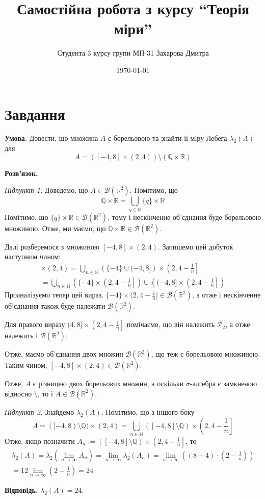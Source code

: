 \documentclass[14pt]{extarticle}
\title{Самостійна робота з курсу ``Теорія міри''}
\author{Студента 3 курсу групи МП-31 Захарова Дмитра}
\date{\today}
\begin{document}
\maketitle

\section*{Завдання}
\textbf{Умова.} Довести, що множина $A$ є борельовою та знайти її мiру Лебега $\lambda_2(A)$ для
\[
A = ([-4,8] \times (2,4)) \setminus (\mathbb{Q} \times \mathbb{R})
\]

\textbf{Розв'язок.} 

\textit{Підпункт 1.} Доведемо, що $A \in \mathcal{B}(\mathbb{R}^2)$. Помітимо, що
\[
\mathbb{Q} \times \mathbb{R} = \bigcup_{q \in \mathbb{Q}} \{q\} \times \mathbb{R}
\]
Помітимо, що $\{q\} \times \mathbb{R} \in \mathcal{B}(\mathbb{R}^2)$, тому і нескінченне об'єднання буде борельовою множиною. Отже, ми маємо, що $\mathbb{Q} \times \mathbb{R} \in \mathcal{B}(\mathbb{R}^2)$.

Далі розберемося з множиною $[-4,8] \times (2,4)$. Запишемо цей добуток наступним чином:
\begin{gather*}
[-4,8] \times (2,4) = \bigcup_{n \in \mathbb{N}} \left(\{-4\} \cup (-4,8]\right) \times \left( 2, 4 - \frac{1}{n} \right] \\
= \bigcup_{n \in \mathbb{N}} \left( \{-4\} \times \left(2,4-\frac{1}{n}\right]\right) \cup \left((-4,8] \times \left(2,4-\frac{1}{n}\right]\right)
\end{gather*}
Проаналізуємо тепер цей вираз. $\{-4\}\times (2,4-\frac{1}{n}] \in \mathcal{B}(\mathbb{R}^2)$, а отже і нескінченне об'єднання також буде належати $\mathcal{B}(\mathbb{R}^2)$. 

Для правого виразу $(4,8] \times \left(2,4-\frac{1}{n}\right]$ помічаємо, що він належить $\mathcal{P}_2$, а отже належить і $\mathcal{B}(\mathbb{R}^2)$. 

Отже, маємо об'єднання двох множин $\mathcal{B}(\mathbb{R}^2)$, що теж є борельовою множиною. Таким чином, $[-4,8] \times (2,4) \in \mathcal{B}(\mathbb{R}^2)$.

Отже, $A$ є різницею двох борельових множин, а оскільки $\sigma$-алгебра є замкненою відносно $\setminus$, то і $A \in \mathcal{B}(\mathbb{R}^2)$.

\textit{Підпункт 2.} Знайдемо $\lambda_2(A)$. Помітимо, що з іншого боку
\[
A = ([-4,8) \setminus \mathbb{Q}) \times (2,4) = \bigcup_{n \in \mathbb{N}} ([-4,8] \setminus \mathbb{Q}) \times \left(2,4-\frac{1}{n}\right]
\]
Отже, якщо позначити $A_n := \left([-4,8] \setminus \mathbb{Q}\right) \times \left(2,4-\frac{1}{n}\right]$, то
\begin{gather*}
\lambda_2(A) = \lambda_2(\lim_{n \to \infty}A_n) = \lim_{n \to \infty}\lambda_2(A_n) = \lim_{n \to \infty}\left((8+4) \cdot \left(2 - \frac{1}{n}\right)\right) \\
= 12 \lim_{n \to \infty}\left(2 - \frac{1}{n}\right) = 24
\end{gather*}

\textbf{Відповідь.} $\lambda_2(A) = 24$.
\end{document}
